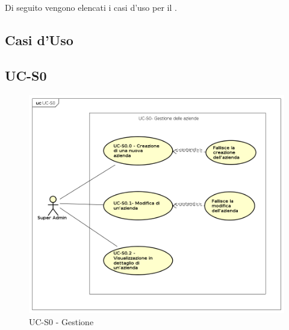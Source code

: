 \section{}

Di seguito vengono elencati i casi d'uso per il .

\newpage

\subsection{Casi d'Uso}

\subsection{UC-S0}

    \begin{figure}[h]
      \begin{center}
        \includegraphics[width=12cm]{res/img/UCSuperadmin/UCS0.png}
      \caption{UC-S0 - Gestione }
      \end{center} 
    \end{figure}    
    

